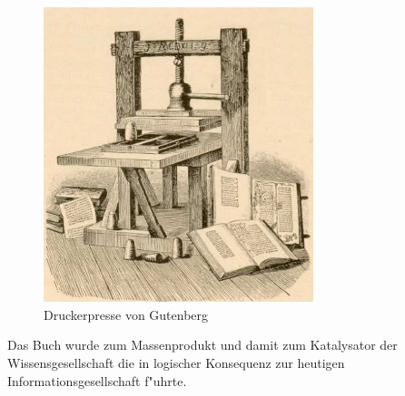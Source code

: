 \begin{figure}[ht]
\centering
\includegraphics[width=0.7\textwidth]{images/presse} 
\caption[Druckerpresse von Gutenberg \cite{fig:presse}]{Druckerpresse von Gutenberg}
\label{fig:druckerpresse}
\end{figure}

Das Buch wurde zum Massenprodukt und damit zum Katalysator der Wissensgesellschaft die in logischer Konsequenz zur heutigen Informationsgesellschaft f"uhrte.


